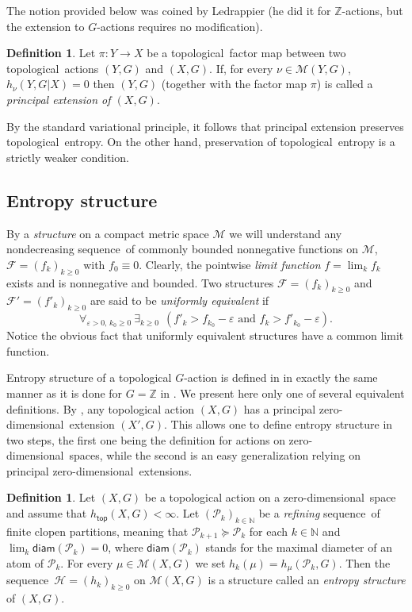 \documentclass[12pt]{amsart}
\theoremstyle{definition}
\newtheorem{definition}[theorem]{Definition}
\numberwithin{equation}{section}
\def \N {\mathbb N}
\def \Z {\mathbb Z}
\def \F {\mathcal F}
\def \H {\mathcal H}
\def \P {\mathcal P}
\def \M {\mathcal M}
\def \htop {h_{\mathsf{top}}}
\def \sq {sequence}
\def \tl {topological}
\def \diam {\mathsf{diam}}
\def \htop{h_{\mathsf{top}}}
\def \ens {entropy structure}
\def \zd {zero-dimen\-sio\-nal}
\def \N {\mathbb N}
\def \Z {\mathbb Z}
\def \F {\mathcal F}
\def \H {\mathcal H}
\def \P {\mathcal P}
\def \M {\mathcal M}
\def \htop {h_{\mathsf{top}}}
\def \sq {sequence}
\def \tl {topological}
\def \htop{h_{\mathsf{top}}}
\def \ens {entropy structure}
\begin{document}
The notion provided below was coined by Ledrappier \cite{Ledrappier} (he did it for $\Z$-actions, but the extension to $G$-actions requires no modification).

\begin{definition}
Let $\pi:Y\to X$ be a \tl\ factor map between two \tl\ actions $(Y,G)$ and $(X,G)$. If, for every $\nu\in\M(Y,G)$, $h_\nu(Y,G|X)=0$ then $(Y,G)$ (together with the factor map $\pi$) is called a \emph{principal extension of $(X,G)$}.
\end{definition}

By the standard variational principle, it follows that principal extension preserves \tl\ entropy. On the other hand, preservation of \tl\ entropy is a strictly weaker condition.

\subsection{Entropy structure}
By a \emph{structure} on a compact metric space $\M$ we will understand any nondecreasing \sq\ of commonly bounded nonnegative functions on $\M$, $\F =(f_k)_{k\ge 0}$ with $f_0\equiv 0$. Clearly, the pointwise \emph{limit function} $f=\lim_k f_k$ exists and is nonnegative and bounded.
Two structures $\F =(f_k)_{k\ge 0}$ and $\F' = (f'_k)_{k\ge 0}$ are said to be \emph{uniformly equivalent} if
$$
\forall_{\varepsilon>0,\,k_0\ge 0}\ \exists_{k\ge 0}\ \ (f'_k>f_{k_0}-\varepsilon \text{ and } f_k>f'_{k_0}-\varepsilon).
$$
Notice the obvious fact that uniformly equivalent structures have a common limit function.

Entropy structure of a topological $G$-action is defined in \cite{DownarowiczZhang} in exactly the same manner as it is done for $G=\Z$ in \cite{BD}. We present here only one of several equivalent definitions. By \cite[Theorem 3.2]{H}, any topological action $(X, G)$ has a principal \zd\ extension $(X', G)$. This allows one to define entropy structure in two steps, the first one being the definition for actions on \zd\ spaces, while the second is an easy generalization relying on principal \zd\ extensions. 

\begin{definition}\label{ensz}
Let $(X,G)$ be a topological action on a \zd\ space and assume that $\htop(X,G)<\infty$.
Let $(\P_k)_{k\in\N}$ be a \emph{refining} \sq\ of finite clopen partitions, meaning that $\P_{k+1}\succcurlyeq\P_k$ for each $k\in\N$ and $\lim_k\diam(\P_k)=0$, where $\diam(\P_k)$ stands for the maximal diameter of an atom of $\P_k$. For every $\mu\in\M(X,G)$ we set $h_k(\mu) = h_\mu (\P_k, G)$. Then the \sq\ $\H = (h_k)_{k\ge 0}$ on $\M(X,G)$ is a structure called an \emph{\ens} of $(X,G)$.
\end{definition}
\end{document}
